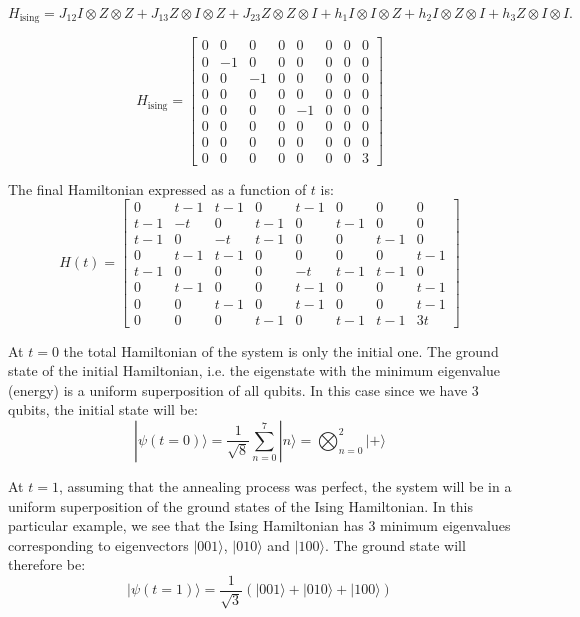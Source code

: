 \documentclass[12pt,a4paper]{report}
\begin{document}
\[
H_{\text{ising}} = J_{12} I \otimes Z \otimes Z + J_{13} Z \otimes I \otimes Z + J_{23} Z \otimes Z \otimes I + h_1 I \otimes I \otimes Z + h_2 I \otimes Z \otimes I + h_3 Z \otimes I \otimes I.
\]

\[
H_{\text{ising}} = \begin{bmatrix}
0 & 0 & 0 & 0 & 0 & 0 & 0 & 0 \\
0 & -1 & 0 & 0 & 0 & 0 & 0 & 0 \\
0 & 0 & -1 & 0 & 0 & 0 & 0 & 0 \\
0 & 0 & 0 & 0 & 0 & 0 & 0 & 0 \\
0 & 0 & 0 & 0 & -1 & 0 & 0 & 0 \\
0 & 0 & 0 & 0 & 0 & 0 & 0 & 0 \\
0 & 0 & 0 & 0 & 0 & 0 & 0 & 0 \\
0 & 0 & 0 & 0 & 0 & 0 & 0 & 3
\end{bmatrix}
\]

\noindent
The final Hamiltonian expressed as a function of \(t\) is:
\[
H(t) = \begin{bmatrix}
0 & t-1 & t-1 & 0 & t-1 & 0 & 0 & 0 \\
t-1 & -t & 0 & t-1 & 0 & t-1 & 0 & 0 \\
t-1 & 0 & -t & t-1 & 0 & 0 & t-1 & 0 \\
0 & t-1 & t-1 & 0 & 0 & 0 & 0 & t-1 \\
t-1 & 0 & 0 & 0 & -t & t-1 & t-1 & 0 \\
0 & t-1 & 0 & 0 & t-1 & 0 & 0 & t-1 \\
0 & 0 & t-1 & 0 & t-1 & 0 & 0 & t-1 \\
0 & 0 & 0 & t-1 & 0 & t-1 & t-1 & 3t
\end{bmatrix}
\]

\newpage
\noindent
At \( t = 0 \) the total Hamiltonian of the system is only the initial one. The ground state of the initial Hamiltonian, i.e. the eigenstate with the minimum eigenvalue (energy) is a uniform superposition of all qubits. In this case since we have 3 qubits, the initial state will be:
\[
|\psi(t=0)\rangle = \frac{1}{\sqrt{8}} \sum_{n=0}^{7} |n\rangle = \bigotimes_{n=0}^{2} |+\rangle
\]

\noindent
At \( t = 1 \), assuming that the annealing process was perfect, the system will be in a uniform superposition of the ground states of the Ising Hamiltonian. In this particular example, we see that the Ising Hamiltonian has 3 minimum eigenvalues corresponding to eigenvectors \( |001\rangle \), \( |010\rangle \) and \( |100\rangle \). The ground state will therefore be:
\[
|\psi(t=1)\rangle = \frac{1}{\sqrt{3}} \left( |001\rangle + |010\rangle + |100\rangle \right)
\]
\end{document}
